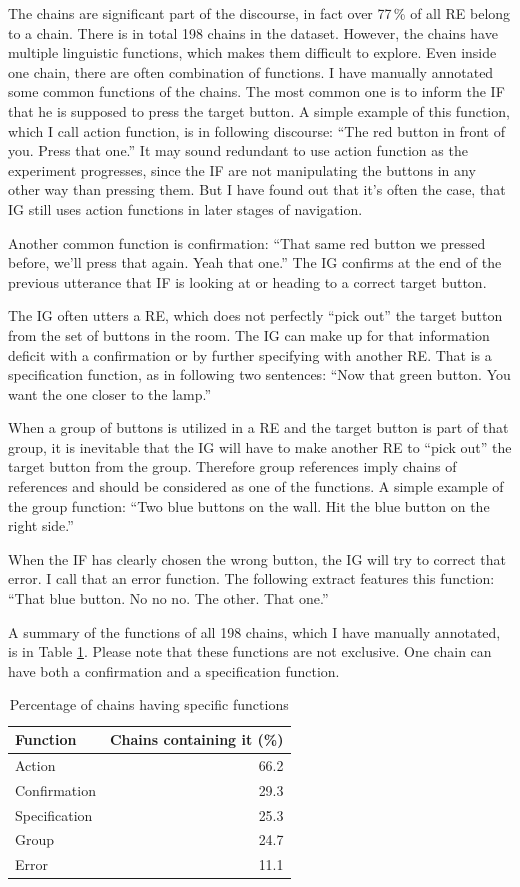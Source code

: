The chains are significant part of the discourse, in fact over 77\,\% of all RE belong to a chain. There is in total 198 chains in the dataset. However, the chains have multiple linguistic functions, which makes them difficult to explore. Even inside one chain, there are often combination of functions. I have manually annotated some common functions of the chains. The most common one is to inform the IF that he is supposed to press the target button. A simple example of this function, which I call action function, is in following discourse: ``The red button in front of you. Press that one.'' It may sound redundant to use action function as the experiment progresses, since the IF are not manipulating the buttons in any other way than pressing them. But I have found out that it's often the case, that IG still uses action functions in later stages of navigation.

Another common function is confirmation: ``That same red button we pressed before, we'll press that again. Yeah that one.'' The IG confirms at the end of the previous utterance that IF is looking at or heading to a correct target button.

The IG often utters a RE, which does not perfectly ``pick out'' the target button from the set of buttons in the room. The IG can make up for that information deficit with a confirmation or by further specifying with another RE. That is a specification function, as in following two sentences: ``Now that green button. You want the one closer to the lamp.''

When a group of buttons is utilized in a RE and the target button is part of that group, it is inevitable that the IG will have to make another RE to ``pick out'' the target button from the group. Therefore group references imply chains of references and should be considered as one of the functions. A simple example of the group function: ``Two blue buttons on the wall. Hit the blue button on the right side.''

When the IF has clearly chosen the wrong button, the IG will try to correct that error. I call that an error function. The following extract features this function: ``That blue button. No no no. The other. That one.''

A summary of the functions of all 198 chains, which I have manually annotated, is in Table \ref{tab:chains-functions}. Please note that these functions are not exclusive. One chain can have both a confirmation and a specification function.

\begin{table}[!htbp]
 \centering
\begin{tabular}{lr}
\toprule
Function   & Chains containing it (\%)  \\
\midrule
Action    		& 66.2\\
Confirmation	 	& 29.3\\
Specification 	& 25.3\\
Group 	  		& 24.7\\
Error 			& 11.1\\
\bottomrule
\end{tabular}
\caption{Percentage of chains having specific functions}
\label{tab:chains-functions}
\end{table}

